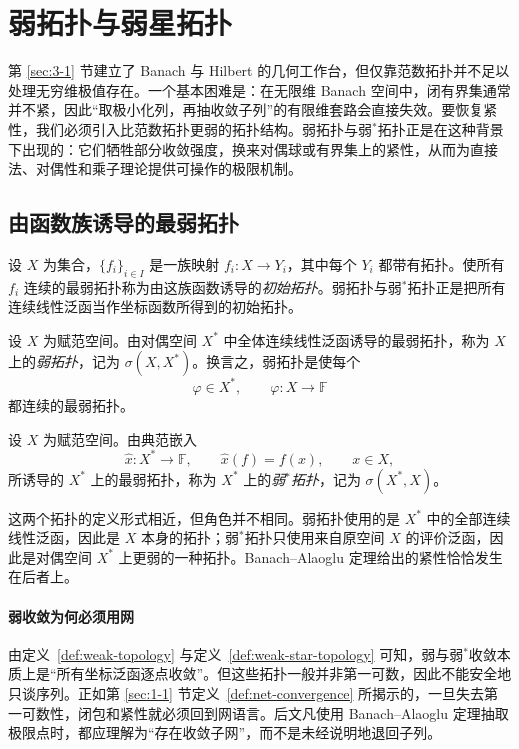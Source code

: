 \section{弱拓扑与弱星拓扑}

\label{sec:3-2}

第 \ref{sec:3-1} 节建立了 Banach 与 Hilbert 的几何工作台，但仅靠范数拓扑并不足以处理无穷维极值存在。一个基本困难是：在无限维 Banach 空间中，闭有界集通常并不紧，因此“取极小化列，再抽收敛子列”的有限维套路会直接失效。要恢复紧性，我们必须引入比范数拓扑更弱的拓扑结构。弱拓扑与弱$^\ast$拓扑正是在这种背景下出现的：它们牺牲部分收敛强度，换来对偶球或有界集上的紧性，从而为直接法、对偶性和乘子理论提供可操作的极限机制。

\subsection{由函数族诱导的最弱拓扑}

设 $X$ 为集合，$\{f_i\}_{i\in I}$ 是一族映射 $f_i\colon X\to Y_i$，其中每个 $Y_i$ 都带有拓扑。使所有 $f_i$ 连续的最弱拓扑称为由这族函数诱导的\emph{初始拓扑}。弱拓扑与弱$^\ast$拓扑正是把所有连续线性泛函当作坐标函数所得到的初始拓扑。

\begin{definition}[弱拓扑]\label{def:weak-topology}
设 $X$ 为赋范空间。由对偶空间 $X^\ast$ 中全体连续线性泛函诱导的最弱拓扑，称为 $X$ 上的\emph{弱拓扑}，记为 $\sigma(X,X^\ast)$。换言之，弱拓扑是使每个
\[
\varphi\in X^\ast,\qquad \varphi\colon X\to \mathbb F
\]
都连续的最弱拓扑。
\end{definition}

\begin{definition}[弱星拓扑]\label{def:weak-star-topology}
设 $X$ 为赋范空间。由典范嵌入
\[
\hat{x}\colon X^\ast\to \mathbb F,\qquad \hat{x}(f)=f(x),\qquad x\in X,
\]
所诱导的 $X^\ast$ 上的最弱拓扑，称为 $X^\ast$ 上的\emph{弱$^\ast$拓扑}，记为 $\sigma(X^\ast,X)$。
\end{definition}

这两个拓扑的定义形式相近，但角色并不相同。弱拓扑使用的是 $X^\ast$ 中的全部连续线性泛函，因此是 $X$ 本身的拓扑；弱$^\ast$拓扑只使用来自原空间 $X$ 的评价泛函，因此是对偶空间 $X^\ast$ 上更弱的一种拓扑。Banach--Alaoglu 定理给出的紧性恰恰发生在后者上。

\paragraph{弱收敛为何必须用网}

\begin{remark}
由定义~\ref{def:weak-topology} 与定义~\ref{def:weak-star-topology} 可知，弱与弱$^\ast$收敛本质上是“所有坐标泛函逐点收敛”。但这些拓扑一般并非第一可数，因此不能安全地只谈序列。正如第 \ref{sec:1-1} 节定义~\ref{def:net-convergence} 所揭示的，一旦失去第一可数性，闭包和紧性就必须回到网语言。后文凡使用 Banach--Alaoglu 定理抽取极限点时，都应理解为“存在收敛子网”，而不是未经说明地退回子列。
\end{remark}

